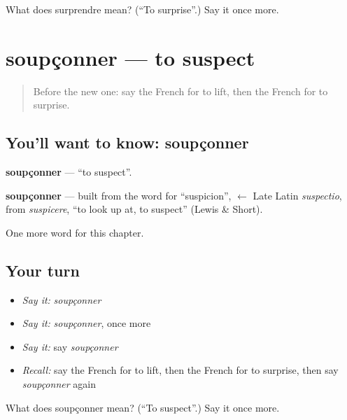\begin{tcolorbox}[breakable,colback=teal!4,colframe=teal!35!black,title={Before you move on}]
What does surprendre mean? (\textquotedblleft{}To surprise\textquotedblright{}.) Say it once more.
\end{tcolorbox}
\section[soupçonner]{soupçonner — to suspect}

\label{lesson:FR-C213-soupconner}



\begin{quote}
Before the new one: say the French for to lift, then the French for to surprise.
\end{quote}

\subsection*{You'll want to know: soupçonner}
\textbf{soupçonner} — \textquotedblleft{}to suspect\textquotedblright{}.

\begin{cousinweb}
\textbf{soupçonner} — built from the word for \textquotedblleft{}suspicion\textquotedblright{}, $\leftarrow$ Late Latin \emph{suspectio}, from \emph{suspicere}, \textquotedblleft{}to look up at, to suspect\textquotedblright{} (Lewis \& Short).
\end{cousinweb}

\begin{grammarlens}[title={What you've built}]
One more word for this chapter.
\end{grammarlens}

\subsection*{Your turn}
\begin{itemize}
\raggedright
  \item \emph{Say it:} \emph{soupçonner}
  \item \emph{Say it:} \emph{soupçonner}, once more
  \item \emph{Say it:} say \emph{soupçonner}
  \item \emph{Recall:} say the French for to lift, then the French for to surprise, then say \emph{soupçonner} again
\end{itemize}

\begin{tcolorbox}[breakable,colback=teal!4,colframe=teal!35!black,title={Before you move on}]
What does soupçonner mean? (\textquotedblleft{}To suspect\textquotedblright{}.) Say it once more.
\end{tcolorbox}
